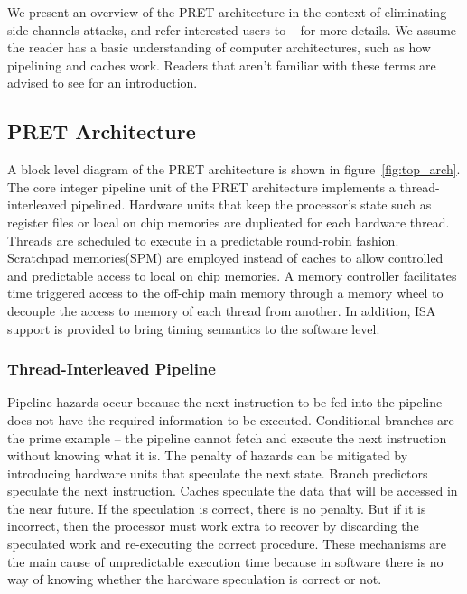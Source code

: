 \documentclass[times, 10pt,twocolumn]{article}
\begin{document}
We present an overview of the PRET architecture in the context of eliminating side channels attacks, and refer interested users to ~\cite{pret_cases08} for more details. We assume the reader has a basic understanding of computer architectures, such as how pipelining and caches work. Readers that aren't familiar with these terms are advised to see \cite{patterson2005coa} for an introduction.
\subsection{PRET Architecture}
A block level diagram of the PRET architecture is shown in figure~\ref{fig:top_arch}. The core integer pipeline unit of the PRET architecture implements a thread-interleaved pipelined. Hardware units that keep the processor's state such as register files or local on chip memories are duplicated for each hardware thread. Threads are scheduled to execute in a predictable round-robin fashion. Scratchpad memories\cite{Banakar2002}(SPM) are employed instead of caches to allow controlled and predictable access to local on chip memories. A memory controller facilitates time triggered access to the off-chip main memory through a memory wheel to decouple the access to memory of each thread from another. In addition, ISA support is provided to bring timing semantics to the software level.

\subsubsection {Thread-Interleaved Pipeline}
Pipeline hazards occur because the next instruction to be fed into the pipeline does not have the required information to be executed. Conditional branches are the prime example -- the pipeline cannot fetch and execute the next instruction without knowing what it is. The penalty of hazards can be mitigated by introducing hardware units that speculate the next state. Branch predictors speculate the next instruction. Caches speculate the data that will be accessed in the near future. If the speculation is correct, there is no penalty. But if it is incorrect, then the processor must work extra to recover by discarding the speculated work and re-executing the correct procedure. These mechanisms are the main cause of unpredictable execution time because in software there is no way of knowing whether the hardware speculation is correct or not. 
\end{document}
